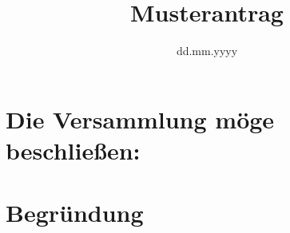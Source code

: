 \documentclass{juso-antrag}
\title{Musterantrag}%
\date{dd.mm.yyyy}%
\begin{document}
    \maketitle
    
    \section*{Die Versammlung möge beschließen:}
    \label{sec:die-versammlung-möge-beschließen:}
    
    \begin{linenumbers}

    \end{linenumbers}

    \section*{Begründung}
    \label{sec:begründung}

\end{document}
